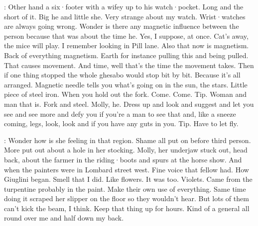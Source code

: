 \Bloom:
Other hand a six·footer with a wifey up to his watch·pocket.
Long and
the short of it.
Big he and little she.
Very strange about my watch.
Wrist·watches are always going wrong.
Wonder is there any magnetic
influence between the person because that was about the time he.
Yes,
I suppose,
at once.
Cat's away,
the mice will play.
I remember looking in Pill lane.
Also that now is magnetism.
Back of everything magnetism.
Earth
for instance
pulling this and being pulled.
That causes movement.
And time,
well that's the time the movement takes.
Then if one thing stopped
the whole ghesabo would stop bit by bit.
Because it's all arranged.
Magnetic needle tells you what's going on in the sun,
the stars.
Little
piece of steel iron.
When you hold out the fork.
Come.
Come.
Tip.
Woman
and man that is.
Fork and steel.
Molly,
he.
Dress up and look and suggest
and let you see and see more and defy you if you're a man to see that and,
like a sneeze coming,
legs,
look,
look and if you have any guts in you.
Tip.
Have to let fly.

\Bloom:
Wonder how is she feeling in that region.
Shame all put on
before third person.
More put out about a hole in her stocking.
Molly,
her underjaw stuck out,
head back,
about the farmer in the riding·boots and spurs
at the horse show.
And when the painters were in Lombard street west.
Fine voice
that fellow had.
How Giuglini began.
Smell that I did.
Like flowers.
It was too.
Violets.
Came from the turpentine probably in
the paint.
Make their own use of everything.
Same time doing it scraped
her slipper on the floor so they wouldn't hear.
But lots of them can't
kick the beam,
I think.
Keep that thing up for hours.
Kind of a general
all round over me and half down my back.

